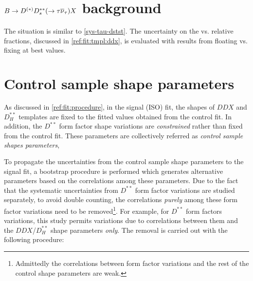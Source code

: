 \section{$B \rightarrow D^{(*)} D^{**}_s (\rightarrow \tau{\ensuremath{{\overline{\nu}}_\tau}}) X$ background}
\label{sys-tau-ddx}

The situation is similar to \cref{sys-tau-dstst}.
The uncertainty on the \tauon vs. \muon relative fractions,
discussed in \cref{ref:fit:tmpl:ddx},
is evaluated with results from floating vs. fixing at best values.


\section{Control sample shape parameters}
\label{sys-model-ctrl}

As discussed in \cref{ref:fit:procedure},
in the signal (ISO) fit,
the shapes of $DDX$ and $D^{**}_H$ templates
are fixed to the fitted values obtained from the control fit.
In addition, the $D^{**}$ form factor shape variations are \emph{constrained}
rather than fixed from the control fit.
These parameters are collectively referred as
\emph{control sample shapes parameters},

To propagate the uncertainties from the control sample shape parameters to
the signal fit,
a bootstrap procedure is performed which generates alternative parameters based
on the correlations among these parameters.
Due to the fact that the systematic uncertainties from $D^{**}$ form factor
variations are studied separately,
to avoid double counting,
the correlations \emph{purely} among these form factor variations need to be
removed\footnote{
    Admittedly the correlations between form factor variations and the rest of
    the control shape parameters are weak.
}.
For example, for $D^{**}$ form factors variations,
this study permits variations due to
correlations between them and the $DDX$/$D^{**}_H$ shape parameters \emph{only}.
The removal is carried out with the following procedure:

